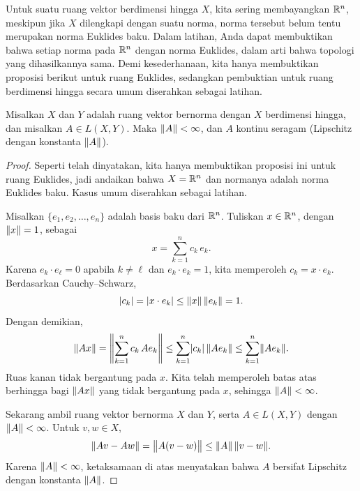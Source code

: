 Untuk suatu ruang vektor berdimensi hingga $X$, kita sering membayangkan
${\mathbb{R}}^n$, meskipun jika $X$ dilengkapi dengan suatu norma, norma tersebut belum tentu
merupakan norma Euklides baku.  Dalam latihan, Anda dapat membuktikan bahwa
setiap norma pada ${\mathbb{R}}^n$  dengan norma Euklides, dalam arti bahwa
topologi yang dihasilkannya sama.  Demi kesederhanaan, kita hanya membuktikan
proposisi berikut untuk ruang Euklides, sedangkan pembuktian untuk ruang
berdimensi hingga secara umum diserahkan sebagai latihan.

\begin{prop} \label{prop:finitedimpropnormfin}
Misalkan $X$ dan $Y$ adalah ruang vektor bernorma dengan
$X$ berdimensi hingga, dan misalkan
$A \in L(X,Y)$.
Maka $\lVert {A} \rVert < \infty$, dan
$A$ kontinu seragam (Lipschitz dengan konstanta $\lVert {A} \rVert$).
\end{prop}

\begin{proof}
Seperti telah dinyatakan, kita hanya membuktikan proposisi ini untuk ruang Euklides, jadi andaikan
bahwa $X = {\mathbb{R}}^n$ dan normanya adalah norma Euklides baku.
Kasus umum diserahkan sebagai latihan.

Misalkan $\{ e_1,e_2,\ldots,e_n \}$ adalah basis baku dari ${\mathbb{R}}^n$.
Tuliskan $x \in {\mathbb{R}}^n$, dengan $\lVert {x} \rVert = 1$, sebagai
\begin{equation*}
x = \sum_{k=1}^n c_k \, e_k .
\end{equation*}
Karena $e_k \cdot e_\ell = 0$ apabila $k \neq \ell$ dan $e_k \cdot e_k = 1$,
kita memperoleh $c_k = x \cdot e_k$.  Berdasarkan Cauchy--Schwarz,
\begin{equation*}
\lvert {c_k} \rvert = \lvert { x \cdot e_k } \rvert
\leq \lVert {x} \rVert \, \lVert {e_k} \rVert = 1 .
\end{equation*}
Dengan demikian,
\begin{equation*}
\lVert {Ax} \rVert =
\left\lVert {\sum_{k=1}^n c_k \, Ae_k} \right\rVert
\leq
\sum_{k=1}^n \lvert {c_k} \rvert \, \lVert {Ae_k} \rVert 
\leq
\sum_{k=1}^n \lVert {Ae_k} \rVert .
\end{equation*}
Ruas kanan tidak bergantung pada $x$.  Kita telah memperoleh
batas atas berhingga bagi $\lVert {Ax} \rVert$ yang tidak bergantung pada $x$, sehingga $\lVert {A} \rVert < \infty$.

Sekarang ambil ruang vektor bernorma $X$ dan $Y$, serta $A \in L(X,Y)$ dengan
$\lVert {A} \rVert < \infty$.
Untuk $v,w \in X$,
\begin{equation*}
\lVert {Av - Aw} \rVert =
\bigl\lVert {A(v-w)} \bigr\rVert \leq \lVert {A} \rVert \, \lVert {v-w} \rVert .
\end{equation*}
Karena $\lVert {A} \rVert < \infty$, ketaksamaan di atas menyatakan bahwa
$A$ bersifat Lipschitz dengan konstanta $\lVert {A} \rVert$.
\end{proof}

